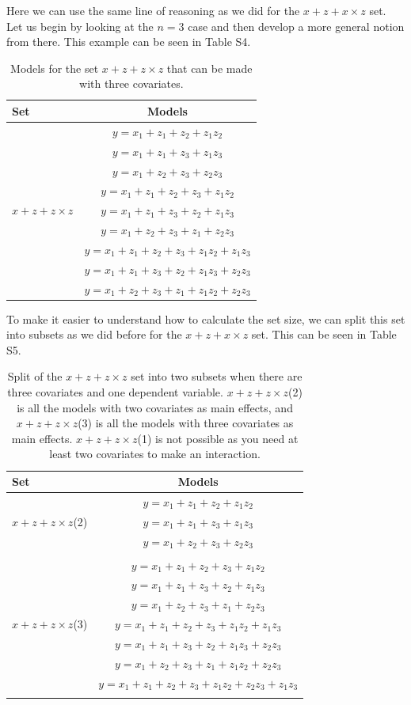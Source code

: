 Here we can use the same line of reasoning as we did for the $x + z + x \times z$ set. Let us begin by looking at the $n=3$ case and then develop a more general notion from there. This example can be seen in Table S4. 
\begin{table}{}
\centering
\caption{Models for the set $x + z + z \times z$ that can be made with three covariates.}
\begin{tabular}{lc} \hline
\toprule
Set & Models \\
\midrule
\multirow{9}{*}{$x + z + z \times z$} & $y=x_1+z_1+z_2+z_1z_2$\\ & $y=x_1+z_1+z_3+z_1z_3$\\ & $y=x_1+z_2+z_3+z_2z_3$\\ & $y=x_1+z_1+z_2+z_3+z_1z_2$\\ & $y=x_1+z_1+z_3+z_2+z_1z_3$\\ & $y=x_1+z_2+z_3+z_1+z_2z_3$\\ & $y=x_1+z_1+z_2+z_3+z_1z_2+z_1z_3$\\ & $y=x_1+z_1+z_3+z_2+z_1z_3+z_2z_3$\\ & $y=x_1+z_2+z_3+z_1+z_1z_2+z_2z_3$ \\
\bottomrule
\end{tabular}
\end{table}
To make it easier to understand how to calculate the set size, we can split this set into subsets as we did before for the $x + z + x \times z$ set. This can be seen in Table S5.

\begin{table}
\centering
\caption{Split of the $x + z + z \times z$ set into two subsets when there are three covariates and one dependent variable. $x + z + z \times z$(2) is all the models with two covariates as main effects, and $x + z + z \times z$(3) is all the models with three covariates as main effects. $x + z + z \times z$(1) is not possible as you need at least two covariates to make an interaction.}
\begin{tabular}{lc} 
\toprule
Set & Models \\ 
\midrule
\multirow{3}{*}{$x + z + z \times z$(2)} & $y=x_1+z_1+z_2+z_1z_2$\\ & $y=x_1+z_1+z_3+z_1z_3$\\ & $y=x_1+z_2+z_3+z_2z_3$\\ &  \\  
\multirow{7}{*}{$x + z + z \times z$(3)} & $y=x_1+z_1+z_2+z_3+z_1z_2$\\ & $y=x_1+z_1+z_3+z_2+z_1z_3$\\ & $y=x_1+z_2+z_3+z_1+z_2z_3$\\ & $y=x_1+z_1+z_2+z_3+z_1z_2+z_1z_3$\\ & $y=x_1+z_1+z_3+z_2+z_1z_3+z_2z_3$\\ & $y=x_1+z_2+z_3+z_1+z_1z_2+z_2z_3$\\ & $y=x_1+z_1+z_2+z_3+z_1z_2+z_2z_3+z_1z_3$\\ & \\ 
\bottomrule
\end{tabular}
\end{table}


